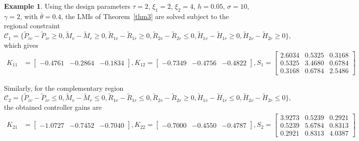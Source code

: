 \documentclass[preprint,review,fleqn,sort&compress,3p]{elsarticle}
\theoremstyle{definition} %
\theoremstyle{definition}%
\newtheorem{example}{Example}
\begin{document}
\begin{example}
Using the design parameters $\tau = 2$, $\xi_1 = 2$, $\xi_2 = 4$, $h = 0.05$, $\sigma = 10$, $\gamma = 2$, with $\bar{\theta} = 0.4$, the LMIs of Theorem~\ref{thm3} are solved subject to the regional constraint
$
\mathcal{C}_1=\{\widetilde{P}_{iv}-\widetilde{P}_{ir} \ge 0, \widetilde{M}_{v}-\widetilde{M}_{r} \ge 0, 
\widetilde{R}_{1v}-\widetilde{R}_{1r} \ge 0,
\widetilde{R}_{2v}-\widetilde{R}_{2r} \leq 0,
\widetilde{H}_{1v}-\widetilde{H}_{1r} \ge 0, 
\widetilde{H}_{2v}-\widetilde{H}_{2r} \ge 0\},
$
which gives
\begin{equation*}       
	\begin{aligned}     
		K_{11} &=
		\begin{bmatrix}
			-0.4761 & -0.2864 & -0.1834
		\end{bmatrix}, 
		K_{12} =     
		\begin{bmatrix}
			-0.7349 & -0.4756 & -0.4822
		\end{bmatrix}, 
		S_1 =
		\begin{bmatrix}
		2.6034  & 0.5325 & 0.3168 \\
		0.5325 &  3.4680 & 0.6784 \\
		0.3168 & 0.6784 &  2.5486
		\end{bmatrix}
	\end{aligned}
\end{equation*}

Similarly, for the complementary region
$
\mathcal{C}_2=\{\widetilde{P}_{iv}-\widetilde{P}_{ir} \le 0, \widetilde{M}_{v}-\widetilde{M}_{r} \le 0, 
\widetilde{R}_{1v}-\widetilde{R}_{1r} \le 0, 
\widetilde{R}_{2v}-\widetilde{R}_{2r} \ge 0, 
\widetilde{H}_{1v}-\widetilde{H}_{1r} \le 0, 
\widetilde{H}_{2v}-\widetilde{H}_{2r} \le 0\},
$
the obtained controller gains are
\begin{equation*}           
	\begin{aligned}
		K_{21} &=
		\begin{bmatrix}
			-1.0727 & -0.7452 & -0.7040
		\end{bmatrix},
		K_{22} =      
		\begin{bmatrix}
			-0.7000  & -0.4550 & -0.4787
		\end{bmatrix}, 
		S_2 =
		\begin{bmatrix}
		3.9273  &  0.5239 & 0.2921 \\
		0.5239 &  5.6784 & 0.8313 \\
		0.2921 & 0.8313 &  4.0387
		\end{bmatrix}
	\end{aligned}
\end{equation*}


\end{example}
\end{document}
